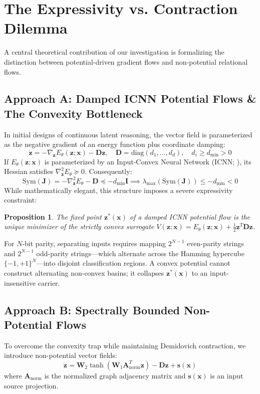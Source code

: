 \documentclass[11pt,a4paper]{article}
\newtheorem{proposition}{Proposition}
\begin{document}
\section{The Expressivity vs. Contraction Dilemma}
\label{sec:expressivity}

A central theoretical contribution of our investigation is formalizing the distinction between potential-driven gradient flows and non-potential relational flows.

\subsection{Approach A: Damped ICNN Potential Flows \& The Convexity Bottleneck}
In initial designs of continuous latent reasoning, the vector field is parameterized as the negative gradient of an energy function plus coordinate damping:
\begin{equation}
\dot{\mathbf{z}} = -\nabla_\mathbf{z} E_\theta(\mathbf{z}; \mathbf{x}) - \mathbf{D}\mathbf{z}, \quad \mathbf{D} = \text{diag}(d_1, \dots, d_d), \quad d_i \ge d_{\min} > 0
\end{equation}
If $E_\theta(\mathbf{z}; \mathbf{x})$ is parameterized by an Input-Convex Neural Network (ICNN; \citealp{amos2017input}), its Hessian satisfies $\nabla_\mathbf{z}^2 E_\theta \succeq 0$. Consequently:
\begin{equation}
\text{Sym}(\mathbf{J}) = -\nabla_\mathbf{z}^2 E_\theta - \mathbf{D} \preceq -d_{\min} \mathbf{I} \implies \lambda_{\max}(\text{Sym}(\mathbf{J})) \le -d_{\min} < 0
\end{equation}
While mathematically elegant, this structure imposes a severe expressivity constraint:
\begin{proposition}
The fixed point $\mathbf{z}^*(\mathbf{x})$ of a damped ICNN potential flow is the unique minimizer of the strictly convex surrogate $V(\mathbf{z}; \mathbf{x}) = E_\theta(\mathbf{z}; \mathbf{x}) + \frac{1}{2}\mathbf{z}^T \mathbf{D} \mathbf{z}$.
\end{proposition}
For $N$-bit parity, separating inputs requires mapping $2^{N-1}$ even-parity strings and $2^{N-1}$ odd-parity strings—which alternate across the Hamming hypercube $\{ -1, +1\}^N$—into disjoint classification regions. A convex potential cannot construct alternating non-convex basins; it collapses $\mathbf{z}^*(\mathbf{x})$ to an input-insensitive carrier.

\subsection{Approach B: Spectrally Bounded Non-Potential Flows}
To overcome the convexity trap while maintaining Demidovich contraction, we introduce non-potential vector fields:
\begin{equation}
\dot{\mathbf{z}} = \mathbf{W}_2 \tanh\left(\mathbf{W}_1 \mathbf{A}_{\text{norm}}^T \mathbf{z}\right) - \mathbf{D}\mathbf{z} + \mathbf{s}(\mathbf{x})
\end{equation}
where $\mathbf{A}_{\text{norm}}$ is the normalized graph adjacency matrix and $\mathbf{s}(\mathbf{x})$ is an input source projection.
\end{document}
